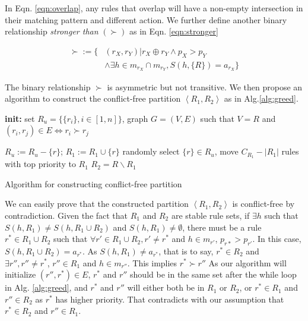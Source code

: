 \documentclass[10pt,twocolumn,letterpaper]{article}
\begin{document}
In Eqn. \ref{eqn:overlap}, any rules that overlap will have a non-empty intersection in their matching pattern and different action. We further define another binary relationship \textit{stronger than} $(\succ)$ as in Eqn. \ref{eqn:stronger}

\begin{align}
	\succ := \{&(r_X,r_Y) | r_X \oplus r_Y \land p_X>p_Y \\
	&\land \exists h\in m_{r_X}\cap m_{r_Y}, S(h,\{R\})=a_{r_X} \}\label{eqn:stronger} 
\end{align}

The binary relationship $\succ$ is asymmetric but not transitive. We then propose an algorithm to construct the conflict-free partition $\left< R_1, R_2 \right>$ as in Alg.\ref{alg:greed}.

\begin{algorithm}[h]
\textbf{init:} set $R_u=\{\{r_i\},i\in [1,n]\}$, graph $G = (V,E)$ such that $V=R$ and $(r_i,r_j)\in E \iff r_i \succ r_j$\;

{
	$R_u := R_u - \{r\}$; $R_1 := R_1 \cup \{r\} $\;
}
{
	randomly select $\{r\} \in R_u$, move $C_{R_1}-|R_1|$ rules with top priority to $R_1$\;
}
$R_2 = R\backslash R_1$\;
\caption{Algorithm for constructing conflict-free partition}
\label{alg:greed}
\end{algorithm}

We can easily prove that the constructed partition $\left< R_1, R_2 \right>$ is conflict-free by contradiction. Given the fact that $R_1$ and $R_2$ are stable rule sets, if $\exists h$ such that $S(h,R_1)\neq S(h,R_1 \cup R_2)$ and $S(h,R_1)\neq \emptyset$, there must be a rule $r^*\in R_1 \cup R_2$ such that $\forall r' \in R_1 \cup R_2, r'\neq r^* $ and $ h\in m_{r'}$, $p_{r*}>p_{r'}$. In this case, $S(h,R_1 \cup R_2)=a_{r^*}$. As $S(h,R_1) \neq a_{r^*}$, that is to say, $r^* \in R_2$ and $\exists r'', r''\neq r^* $, $ r''\in R_1$ and $h\in m_{r''}$. This implies $r^*\succ r''$ As our algorithm will initialize $(r'',r^*)\in E$, $r^*$ and $r''$ should be in the same set after the while loop in Alg. \ref{alg:greed}, and $r^*$ and $r''$ will either both be in $R_1$ or $R_2$, or $r^* \in R_1$ and $r'' \in R_2 $ as $r^*$ has higher priority. That contradicts with our assumption that $r^* \in R_2$ and $r'' \in R_1$.
\end{document}
